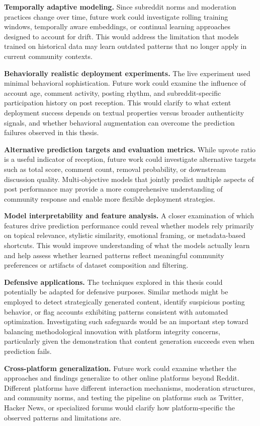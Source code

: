 \textbf{Temporally adaptive modeling.} Since subreddit norms and moderation practices change over time, future work could investigate rolling training windows, temporally aware embeddings, or continual learning approaches designed to account for drift. This would address the limitation that models trained on historical data may learn outdated patterns that no longer apply in current community contexts.

\textbf{Behaviorally realistic deployment experiments.} The live experiment used minimal behavioral sophistication. Future work could examine the influence of account age, comment activity, posting rhythm, and subreddit-specific participation history on post reception. This would clarify to what extent deployment success depends on textual properties versus broader authenticity signals, and whether behavioral augmentation can overcome the prediction failures observed in this thesis.

\textbf{Alternative prediction targets and evaluation metrics.} While upvote ratio is a useful indicator of reception, future work could investigate alternative targets such as total score, comment count, removal probability, or downstream discussion quality. Multi-objective models that jointly predict multiple aspects of post performance may provide a more comprehensive understanding of community response and enable more flexible deployment strategies.

\textbf{Model interpretability and feature analysis.} A closer examination of which features drive prediction performance could reveal whether models rely primarily on topical relevance, stylistic similarity, emotional framing, or metadata-based shortcuts. This would improve understanding of what the models actually learn and help assess whether learned patterns reflect meaningful community preferences or artifacts of dataset composition and filtering.

\textbf{Defensive applications.} The techniques explored in this thesis could potentially be adapted for defensive purposes. Similar methods might be employed to detect strategically generated content, identify suspicious posting behavior, or flag accounts exhibiting patterns consistent with automated optimization. Investigating such safeguards would be an important step toward balancing methodological innovation with platform integrity concerns, particularly given the demonstration that content generation succeeds even when prediction fails.

\textbf{Cross-platform generalization.} Future work could examine whether the approaches and findings generalize to other online platforms beyond Reddit. Different platforms have different interaction mechanisms, moderation structures, and community norms, and testing the pipeline on platforms such as Twitter, Hacker News, or specialized forums would clarify how platform-specific the observed patterns and limitations are.

